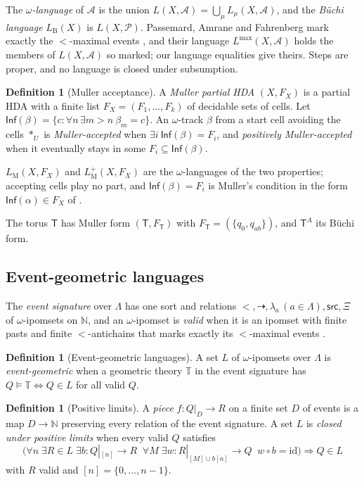 \documentclass{lmcs}
\theoremstyle{definition}
\newtheorem{definition}[theorem]{Definition}
\theoremstyle{remark}
\newcommand{\Nn}{\mathbb{N}}
\newcommand{\Tt}{\mathbb{T}}
\providecommand{\Lang}[2]{L(#1,#2)}
\providecommand{\LB}[1]{L_{\mathrm{B}}(#1)}
\providecommand{\LM}[1]{L_{\mathrm{M}}(#1)}
\providecommand{\LMp}[1]{L^{+}_{\mathrm{M}}(#1)}
\providecommand{\Inf}{\mathsf{Inf}}
\providecommand{\FT}{F_{\mathsf{T}}}
\providecommand{\Lmax}[1]{L^{\max}(#1)}
\begin{document}
The \emph{$\omega$-language} of $\mathcal{A}$ is the union $\Lang{X}{\mathcal{A}}=\bigcup_{\mu}L_\mu(X,\mathcal{A})$, and the \emph{B\"uchi language} $\LB{X}$ is $\Lang{X}{\mathcal{P}}$. Passemard, Amrane and Fahrenberg mark exactly the $<$-maximal events
\cite{PAF25}, and their language $\Lmax{X,\mathcal{A}}$ holds the
members of $\Lang{X}{\mathcal{A}}$ so marked; our language equalities give
theirs. Steps are proper, and no language is closed under
subsumption.

\begin{definition}[Muller acceptance]\label{def:muller}
A \emph{Muller partial HDA} $(X,F_X)$ is a partial HDA with a finite list $F_X=(F_1,\dots,F_k)$ of decidable sets
of cells. Let $\Inf(\beta)=\{c : \forall n\,\exists m>n\ \beta_m=c\}$. An $\omega$-track
$\beta$ from a start cell avoiding the cells $\ast_U$ is \emph{Muller-accepted} when
$\exists i\ \Inf(\beta)=F_i$, and \emph{positively Muller-accepted} when it eventually stays in some $F_i\subseteq\Inf(\beta)$.
\end{definition}

$\LM{X,F_X}$ and $\LMp{X,F_X}$ are the $\omega$-languages of the two
properties; accepting cells play no part, and
$\Inf(\beta)=F_i$ is Muller's condition in the form $\Inf(\alpha)\in F_X$ of
\cite{PAF25}.

The torus $\mathsf{T}$ has Muller form $(\mathsf{T},\FT)$ with $\FT=(\{q_0,q_{ab}\})$, and
$\mathsf{T}^{A}$ its B\"uchi form.

\subsection{Event-geometric languages}\label{ssec:muller-events}

The \emph{event signature} over $\Lambda$ has one sort and relations $<,\dashrightarrow,\lambda_a\,(a\in\Lambda),\mathsf{src},\Xi$
of $\omega$-ipomsets on $\Nn$, and an $\omega$-ipomset is
\emph{valid} when it is an ipomset with finite pasts and finite $<$-antichains that marks exactly its
$<$-maximal events \cite{PAF25}.

\begin{definition}[Event-geometric languages]\label{def:muller-eg}
A set $L$ of $\omega$-ipomsets over $\Lambda$ is \emph{event-geometric} when a geometric theory $\Tt$ in the
event signature has $Q\models\Tt\iff Q\in L$ for all valid $Q$.
\end{definition}

\begin{definition}[Positive limits]\label{def:muller-poslim}
A \emph{piece} $f\colon Q|_D\to R$ on a finite set $D$ of events is a map $D\to\Nn$ preserving every relation of the
event signature. A set $L$ is \emph{closed under positive limits} when every valid $Q$ satisfies
\[
  \bigl(\forall n\;\exists R\in L\;\exists b\colon Q|_{[n]}\to R\;\;\forall M\;\exists w\colon R|_{[M]\cup b[n]}\to Q\;\;w\circ b=\mathrm{id}\bigr)\Rightarrow Q\in L
\]
with $R$ valid and $[n]=\{0,\dots,n-1\}$.
\end{definition}
\end{document}
